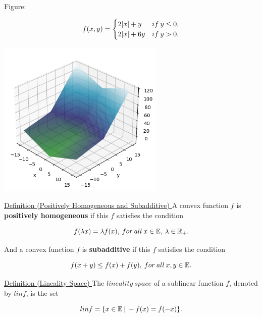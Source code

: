 \documentclass[a4paper,11pt]{jsarticle}
\begin{document}
Figure:

\begin{equation}
  f(x, y)=
  \begin{cases}
    2|x| + y & if\:y \leq 0, \\
    2|x| + 6y & if\:y > 0. \notag
  \end{cases}
\end{equation}

\begin{center}
  \includegraphics[width=8cm]{sublinear_output.png}
\end{center}


\begin{itembox}[l]{\underline{Definition (Positively Homogeneous and Subadditive) }}
  A convex function $f$ is \textbf{positively homogeneous} if this $f$ satisfies the condition

  \begin{equation}
    f(\lambda x) = \lambda f(x),\:for \:all\: x \in{\mathbb{E}},\: \lambda \in{\mathbb{R}}_+. \notag
  \end{equation}

  And a convex function $f$ is \textbf{subadditive} if this $f$ satisfies the condition

  \begin{equation}
    f( x + y) \leq f(x) + f(y),\:for \:all\: x, y \in{\mathbb{E}}. \notag
  \end{equation}

\end{itembox}

\begin{itembox}[l]{\underline{Definition (Lineality Space) }}
  The $lineality\:space$ of a
  sublinear function $f$, denoted by $lin f$, is the set

  \begin{equation}
    lin f = \{x \in \mathbb{E}\:|\:-f(x) = f(-x)\}. \notag
  \end{equation}
\end{itembox}
\end{document}
